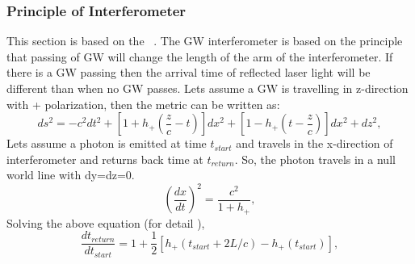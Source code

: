 \documentclass{ttuthes2007}
\begin{document}
\subsubsection{Principle of Interferometer}
This section is based on the ~\cite{Sathyaprakash_2009}. The
\ac{GW} interferometer is based on the principle that passing of \ac{GW} will
change the length of the arm of the interferometer. If there is a \ac{GW}
passing then the arrival time of reflected laser light will be different than when no
\ac{GW} passes. Lets assume a \ac{GW} is travelling in z-direction with +
polarization, then the metric can be written as:
\begin{equation}
ds^2= -c^2dt^2+[1+h_+(\frac{z}{c}-t)]dx^2+[1-h_+(t-\frac{z}{c})]dx^2+dz^2,
\end{equation}
Lets assume a photon is emitted at time $t_{start}$ and travels
in the x-direction of interferometer and returns back time at $t_{return}$. So,
the photon travels in a null world line with dy=dz=0.
\begin{equation}
\left(\frac{dx}{dt}\right)^2=\frac{c^2}{1+h_+},
\end{equation}
Solving the above equation (for detail \cite{Schutz:1985jx}),
\begin{equation}
\frac{dt_{return}}{dt_{start}}=1+\frac{1}{2}[h_+(t_{start}+2L/c)-h_+(t_{start})],
\end{equation}
\end{document}
